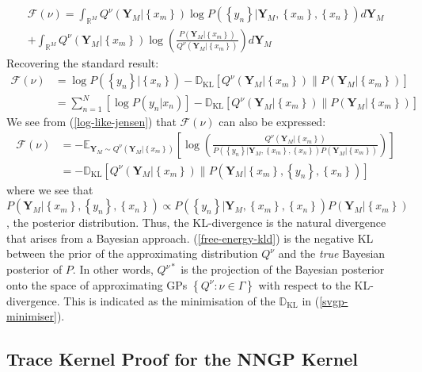 \documentclass{article}
\newcommand{\KLD}{\operatorname{\mathbb{D}_{KL}}}
\numberwithin{equation}{section}
\begin{document}
\begin{multline}
    \mathcal{F(\nu)} = \int_{\mathbb{R}^M} Q^{\nu}\left(\mathbf{Y}_M \big\vert \left\{ x_m\right\} \right) \log P\left(\left\{ y_n\right\} \big\vert \mathbf{Y}_M , \left\{ x_m\right\}, \left\{ x_n\right\}\right)d\mathbf{Y}_M
    \\ + \int_{\mathbb{R}^M} Q^{\nu}\left(\mathbf{Y}_M \big\vert \left\{ x_m\right\} \right) \log \left(\frac{P\left(\mathbf{Y}_M \big\vert \left\{ x_m\right\}\right)}{Q^{\nu}\left(\mathbf{Y}_M \big\vert \left\{ x_m\right\} \right)} \right)d\mathbf{Y}_M
\end{multline}
Recovering the standard result:
\begin{align}
    \mathcal{F(\nu)} &=  \log P\left(\left\{ y_n\right\} \big\vert \left\{ x_n\right\}\right) - \KLD\left[Q^{\nu}\left(\mathbf{Y}_M \big\vert \left\{ x_m\right\} \right) \| P\left(\mathbf{Y}_M \big\vert \left\{ x_m\right\} \right)\right]
    \\ &= \sum_{n=1}^N \left[\log P \left(y_n \big\vert  x_n \right)\right] - \KLD\left[Q^{\nu}\left(\mathbf{Y}_M \vert \left\{ x_m\right\} \right) \| P\left(\mathbf{Y}_M \big\vert \left\{ x_m\right\} \right)\right]
\end{align}
We see from (\ref{log-like-jensen}) that $\mathcal{F(\nu)}$ can also be expressed:
\begin{align}
    \mathcal{F(\nu)} &= - \mathbb{E}_{\mathbf{Y}_M \sim Q^{\nu}\left(\mathbf{Y}_M \big\vert \left\{ x_m\right\} \right)} \left[\log \left(\frac{Q^{\nu}\left(\mathbf{Y}_M \big\vert \left\{ x_m\right\} \right)}{P\left(\left\{ y_n\right\} \big\vert \mathbf{Y}_M , \left\{ x_m\right\}, \left\{ x_n\right\}\right)P\left(\mathbf{Y}_M \big\vert \left\{ x_m\right\}\right)} \right) \right]\\
    &= -\KLD \left[Q^{\nu}\left(\mathbf{Y}_M \big\vert \left\{ x_m\right\} \right) \| P\left(\mathbf{Y}_M \big\vert \left\{ x_m\right\}, \left\{ y_n\right\}, \left\{ x_n\right\}\right) \right]
    \label{free-energy-kld}
\end{align}
where we see that $P\left(\mathbf{Y}_M \big\vert \left\{ x_m\right\}, \left\{ y_n\right\}, \left\{ x_n\right\}\right) \propto P\left(\left\{ y_n\right\} \big\vert \mathbf{Y}_M , \left\{ x_m\right\}, \left\{ x_n\right\}\right)P\left(\mathbf{Y}_M \big\vert \left\{ x_m\right\}\right)$, the posterior distribution.
Thus, the KL-divergence is the natural divergence that arises from a Bayesian approach. (\ref{free-energy-kld}) is the negative KL between the prior of the approximating distribution $Q^{\nu}$ and the \textit{true} Bayesian posterior of $P$. In other words, $Q^{\nu*}$ is the projection of the Bayesian posterior onto the space of approximating GPs $\left\{Q^{\nu}: \nu \in \Gamma\right\}$ with respect to the KL-divergence. This is indicated as the minimisation of the $\KLD$ in (\ref{svgp-minimiser}).

\subsection{Trace Kernel Proof for the NNGP Kernel}\label{svgp-kld-bayesian}
\end{document}
